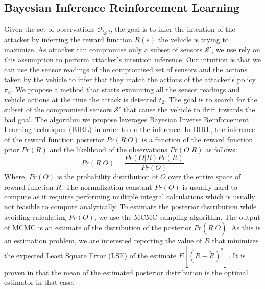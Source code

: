 \documentclass[conference]{IEEEtran}
\begin{document}
\subsection{Bayesian Inference Reinforcement Learning}
Given the set of observations $\mathcal{O}_{t_2:t}$, the goal is to infer the intention of the attacker by inferring the reward function $R(s)$ the vehicle is trying to maximize. As attacker can compromise only a subset of sensors $\mathcal{S}'$, we use rely on this assumption to perform attacker's intention inference. Our intuition is that we can use the sensor readings of the compromised set of sensors and the actions taken by the vehicle to infer that they match the actions of the attacker's policy $\pi_a$. We propose a method that starts examining all the sensor readings and vehicle actions at the time the attack is detected $t_2$. The goal is to search for the subset of the compromised sensors $\mathcal{S}'$  that cause the vehicle to drift towards the bad goal. The algorithm we propose leverages Bayesian Inverse Reinforcement Learning techniques (BIRL)\cite{Ramachandran2007} in order to do the inference. In BIRL, the inference of the reward function posterior $Pr(R|O)$ is a function of the reward function prior $Pr(R)$ and the likelihood of the observations $Pr(O|R)$ as follows:
\begin{equation} 
    Pr(R|O) = \frac{Pr(O|R)Pr(R)}{Pr(O)}
\end{equation}
Where, $Pr(O)$ is the probability distribution of $O$ over the entire space of reward function $R$. The normalization constant $Pr(O)$ is usually hard to compute as it requires performing multiple integral calculations which is usually not feasible to compute analytically. To estimate the posterior distribution while avoiding calculating $Pr(O)$, we use the MCMC sampling algorithm\cite{andrieu2003introduction}. The output of MCMC is an estimate of the distribution of the posterior $Pr(\tilde{R}|O)$. As this is an estimation problem, we are interested reporting the value of $R$ that minimizes the expected Least Square Error (LSE) of the estimate $E[(R-\tilde{R})^2]$. It is proven in \cite{Ramachandran2007} that the mean of the estimated posterior distribution is the optimal estimator in that case.
\end{document}

